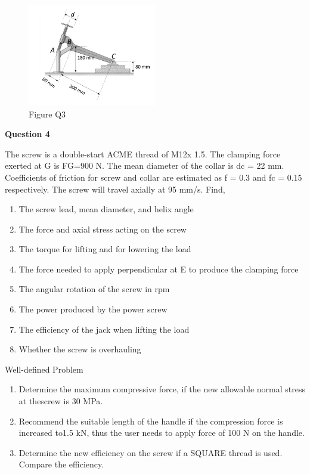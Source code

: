 \documentclass[a4paper, fleqn]{article}
\begin{document}
\begin{figure}[h]
    \centering
    \includegraphics[width=0.5\textwidth]{t2-q3.png}
    \caption{Figure Q3}
\end{figure}


\newpage
\textbf{Question 4}

The screw is a double-start ACME thread of M12x 1.5. The clamping force exerted at G is FG=900 N. The mean diameter of the collar is dc = 22 mm. Coefficients of friction for screw and collar are estimated as f = 0.3 and fc = 0.15 respectively. The screw will travel axially at 95 mm/s. Find,

\begin{enumerate}[label=(\roman*)]
\item The screw lead, mean diameter, and helix angle
\item The force and axial stress acting on the screw
\item The torque for lifting and for lowering the load
\item The force needed to apply perpendicular at E to produce the clamping force
\item The angular rotation of the screw in rpm
\item The power produced by the power screw
\item The efficiency of the jack when lifting the load
\item Whether the screw is overhauling
\end{enumerate}

Well-defined Problem

\begin{enumerate}
\item Determine the maximum compressive force, if the new allowable normal stress at thescrew is 30 MPa.
\item Recommend the suitable length of the handle if the compression force is increased to1.5 kN, thus the user needs to apply force of 100 N on the handle.
\item Determine the new efficiency on the screw if a SQUARE thread is used. Compare the efficiency.
\end{enumerate}
\end{document}
